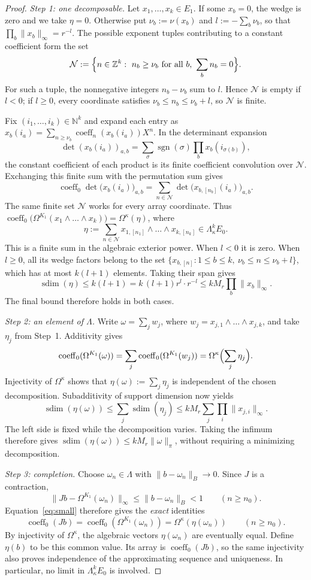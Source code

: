 \documentclass[11pt]{amsart}
\theoremstyle{definition}
\theoremstyle{remark}
\numberwithin{equation}{section}
\newcommand{\N}{\mathbb N}
\newcommand{\Z}{\mathbb Z}
\newcommand{\sgn}{\operatorname{sgn}}
\newcommand{\norm}[1]{\lVert #1\rVert}
\newcommand{\coeff}{\operatorname{coeff}}
\newcommand{\sdim}{\operatorname{sdim}}
\begin{document}
\begin{proof}
\emph{Step 1: one decomposable.} Let $x_1,\dots,x_k\in E_1$. If some $x_b=0$, the wedge is zero and we take $\eta=0$.
Otherwise put $\nu_b:=\nu(x_b)$ and $l:=-\sum_b\nu_b$, so that
$\prod_b\norm{x_b}_\infty=r^{-l}$. The possible exponent tuples contributing to a constant coefficient form the set
\[
\mathcal N:=\Bigl\{n\in\Z^k:\ n_b\ge\nu_b\text{ for all }b,\ \sum_bn_b=0\Bigr\}.
\]
For such a tuple, the nonnegative integers $n_b-\nu_b$ sum to $l$. Hence $\mathcal N$ is empty if $l<0$;
if $l\ge0$, every coordinate satisfies $\nu_b\le n_b\le\nu_b+l$, so $\mathcal N$ is finite.

Fix $(i_1,\dots,i_k)\in\N^k$ and expand each entry as
$x_b(i_a)=\sum_{n\ge\nu_b}\coeff_n(x_b(i_a))X^n$. In the determinant expansion
\[
\det(x_b(i_a))_{a,b}=\sum_\sigma\sgn(\sigma)\prod_bx_b(i_{\sigma(b)}),
\]
the constant coefficient of each product is its finite coefficient convolution over $\mathcal N$.
Exchanging this finite sum with the permutation sum gives
\[
\coeff_0\det\bigl(x_b(i_a)\bigr)_{a,b}
=\sum_{n\in\mathcal N}\det\bigl(x_{b,[n_b]}(i_a)\bigr)_{a,b}.
\]
The same finite set $\mathcal N$ works for every array coordinate. Thus
$\coeff_0\bigl(\Omega^{K_1}(x_1\wedge\dots\wedge x_k)\bigr)=\Omega^\kappa(\eta)$, where
\[
\eta:=\sum_{n\in\mathcal N}x_{1,[n_1]}\wedge\dots\wedge x_{k,[n_k]}\in\Lambda^k_\kappa E_0.
\]
This is a finite sum in the algebraic exterior power. When $l<0$ it is zero. When $l\ge0$, all its wedge factors
belong to the set
$\{x_{b,[n]}:1\le b\le k,\ \nu_b\le n\le\nu_b+l\}$, which has at most $k(l+1)$ elements. Taking their span gives
\[
\sdim(\eta)\le k(l+1)=k\,(l+1)r^l\cdot r^{-l}\le kM_r\prod_b\norm{x_b}_\infty.
\]
The final bound therefore holds in both cases.

\emph{Step 2: an element of $\Lambda$.} Write $\omega=\sum_jw_j$, where
$w_j=x_{j,1}\wedge\dots\wedge x_{j,k}$, and take $\eta_j$ from Step~1. Additivity gives
\[
\coeff_0(\Omega^{K_1}(\omega))
=\sum_j\coeff_0(\Omega^{K_1}(w_j))
=\Omega^\kappa\Bigl(\sum_j\eta_j\Bigr).
\]
Injectivity of $\Omega^\kappa$ shows that $\eta(\omega):=\sum_j\eta_j$ is independent of the chosen decomposition.
Subadditivity of support dimension now yields
\[
\sdim(\eta(\omega))\le\sum_j\sdim(\eta_j)
\le kM_r\sum_j\prod_i\norm{x_{j,i}}_\infty.
\]
The left side is fixed while the decomposition varies. Taking the infimum therefore gives
$\sdim(\eta(\omega))\le kM_r\norm\omega_\pi$, without requiring a minimizing decomposition.

\emph{Step 3: completion.} Choose $\omega_n\in\Lambda$ with $\norm{b-\omega_n}_B\to0$. Since $J$ is a contraction,
\[
\norm{Jb-\Omega^{K_1}(\omega_n)}_\infty\le\norm{b-\omega_n}_B<1
\qquad(n\ge n_0).
\]
Equation~\eqref{eq:small} therefore gives the \emph{exact} identities
\[
\coeff_0(Jb)=\coeff_0(\Omega^{K_1}(\omega_n))=\Omega^\kappa(\eta(\omega_n))
\qquad(n\ge n_0).
\]
By injectivity of $\Omega^\kappa$, the algebraic vectors $\eta(\omega_n)$ are eventually equal. Define $\eta(b)$
to be this common value. Its array is $\coeff_0(Jb)$, so the same injectivity also proves independence of the
approximating sequence and uniqueness. In particular, no limit in $\Lambda^k_\kappa E_0$ is involved.


\end{proof}
\end{document}
